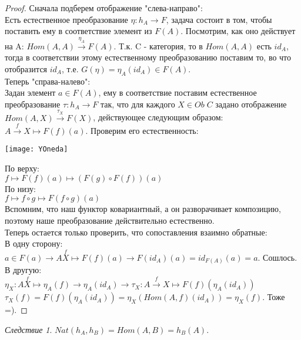 \documentclass[a4paper]{article}
\theoremstyle{indented}
\theoremstyle{definition}
\theoremstyle{remark}
\newtheorem{cons}{Следствие}
\DeclareMathOperator{\ra}{\rightarrow}
\begin{document}
\begin{proof}
    Сначала подберем отображение "слева-направо": \\
    Есть естественное преобразование $\eta: h_A \ra F$, задача состоит в том, чтобы поставить ему в соответствие элемент из $F(A)$. Посмотрим, как оно действует на A: $Hom(A, A) \stackrel{\eta_A}{\ra} F(A)$. Т.к. C - категория, то в $Hom(A, A)$ есть $id_A$, тогда в соответствии этому естественному преобразованию поставим то, во что отобразится $id_A$, т.е. $G(\eta) = \eta_A(id_A) \in F(A)$. \\
    Теперь "справа-налево": \\
    Задан элемент $a \in F(A)$, ему в соответствие поставим естественное преобразование $\tau: h_A \ra F$ так, что для каждого $X \in Ob\;C$ задано отображение $Hom(A, X) \stackrel{\tau_X}{\ra} F(X)$, действующее следующим образом: $A \stackrel{f}{\ra} X \mapsto F(f)(a)$. Проверим его естественность: \\
    
    \begin{center}
        \texttt{[image: YOneda]}
    \end{center}

    По верху: \\
    $f \mapsto F(f)(a) \mapsto (F(g) \circ F(f))(a)$ \\
    По низу: \\
    $f \mapsto f \circ g \mapsto F(f \circ g)(a)$ \\
    Вспомним, что наш функтор ковариантный, а он разворачивает композицию, поэтому наше преобразование действительно естественно. \\
    Теперь остается только проверить, что сопоставления взаимно обратные: \\
    В одну сторону: \\
    $a \in F(a) \longrightarrow A \stackrel{f}{X} \mapsto F(f)(a) \longrightarrow F(id_A)(a) = id_{F(A)}(a) = a$. Сошлось. \\
    В другую: \\
    $\eta_X: A \stackrel{f}{X} \mapsto \eta_A(f) \longrightarrow \eta_A(id_A) \longrightarrow \tau_X: A \stackrel{f}{\ra} X \mapsto F(f)(\eta_A(id_A))$ \\
    $\tau_X(f) = F(f)(\eta_A(id_A)) = \eta_X(Hom(A, f)(id_A)) = \eta_X(f)$. Тоже =).
\end{proof}

\begin{cons} 
    $Nat(h_A, h_B) = Hom(A, B) = h_B(A)$. 
\end{cons} \ 
\end{document}
